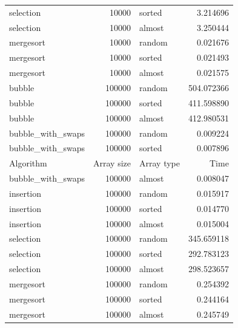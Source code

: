 \documentclass[letterpaper, 11pt]{article}
\begin{document}
\begin{longtable}{lrlr}
         selection &     10000 &   sorted &    3.214696 \\
         selection &     10000 &   almost &    3.250444 \\
         mergesort &     10000 &   random &    0.021676 \\
         mergesort &     10000 &   sorted &    0.021493 \\
         mergesort &     10000 &   almost &    0.021575 \\
            bubble &    100000 &   random &  504.072366 \\
            bubble &    100000 &   sorted &  411.598890 \\
            bubble &    100000 &   almost &  412.980531 \\
 bubble\_with\_swaps &    100000 &   random &    0.009224 \\
 bubble\_with\_swaps &    100000 &   sorted &    0.007896 \\
  Algorithm &  Array size & Array type & Time \\
\hline
 bubble\_with\_swaps &    100000 &   almost &    0.008047 \\
         insertion &    100000 &   random &    0.015917 \\
         insertion &    100000 &   sorted &    0.014770 \\
         insertion &    100000 &   almost &    0.015004 \\
         selection &    100000 &   random &  345.659118 \\
         selection &    100000 &   sorted &  292.783123 \\
         selection &    100000 &   almost &  298.523657 \\
         mergesort &    100000 &   random &    0.254392 \\
         mergesort &    100000 &   sorted &    0.244164 \\
         mergesort &    100000 &   almost &    0.245749 \\
\end{longtable}
\end{document}
